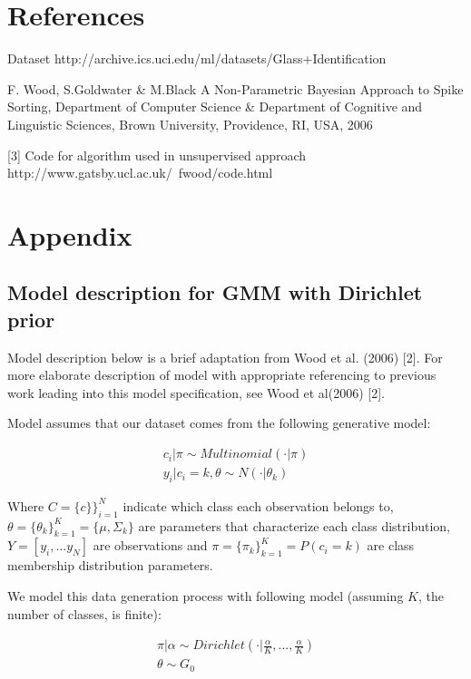 \documentclass[a4paper]{article}
\begin{document}
\section{References}
\par
[1] Dataset http://archive.ics.uci.edu/ml/datasets/Glass+Identification
\par
[2] F. Wood, S.Goldwater \& M.Black A Non-Parametric Bayesian Approach to Spike Sorting, Department of Computer Science \& Department of Cognitive and Linguistic Sciences, Brown University, Providence, RI, USA, 2006

[3] Code for algorithm used in unsupervised approach http://www.gatsby.ucl.ac.uk/~fwood/code.html

\section{Appendix}

\subsection{Model description for GMM with Dirichlet prior}

 Model description below is a brief adaptation from Wood et al. (2006) [2]. For more elaborate description of model with appropriate referencing to previous work leading into this model specification, see  Wood et al(2006) [2]. 

Model assumes that our dataset comes from the following generative model:

\begin{equation}
\begin{aligned}
c_i | \pi \sim Multinomial(\cdot | \pi) \\
y_i | c_i = k, \theta \sim N(\cdot | \theta_k)
\end{aligned}
\end{equation}

Where $C=\{c\}\}^{N}_{i=1}$ indicate which class each observation belongs to, $\theta=\{\theta_k\}^K_{k=1}=\{\mu, \Sigma_{k}\}$ are parameters that characterize each class distribution, $Y=[y_i, ... y_N]$ are observations and $\pi=\{\pi_k\}^K_{k=1}=P(c_i=k)$ are class membership distribution parameters.

We model this data generation process with following model (assuming $K$, the number of classes, is finite):

\begin{equation}
\begin{aligned}
\pi | \alpha \sim Dirichlet(\cdot | \frac{\alpha}{K}, ... , \frac{\alpha}{K}) \\
\theta \sim G_0
\end{aligned}
\end{equation}
\end{document}

